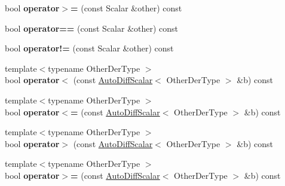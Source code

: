 \begin{DoxyCompactItemize}
\mbox{\label{class_eigen_1_1_auto_diff_scalar_a928b13db715c4631b0cab6feff259580}} 
bool {\bfseries operator$>$=} (const Scalar \&other) const
\item 
\mbox{\label{class_eigen_1_1_auto_diff_scalar_a576e2d0298d249bedd21b11e5373e6ed}} 
bool {\bfseries operator==} (const Scalar \&other) const
\item 
\mbox{\label{class_eigen_1_1_auto_diff_scalar_a2b38b00f5ea9930da21ffc01fc7133db}} 
bool {\bfseries operator!=} (const Scalar \&other) const
\item 
\mbox{\label{class_eigen_1_1_auto_diff_scalar_aecd428e16a509c76d5604dae6d68ff6d}} 
{\footnotesize template$<$typename Other\+Der\+Type $>$ }\\bool {\bfseries operator$<$} (const \hyperlink{class_eigen_1_1_auto_diff_scalar}{Auto\+Diff\+Scalar}$<$ Other\+Der\+Type $>$ \&b) const
\item 
\mbox{\label{class_eigen_1_1_auto_diff_scalar_ad3f29b9306f23230ff84ae30a5d35f8f}} 
{\footnotesize template$<$typename Other\+Der\+Type $>$ }\\bool {\bfseries operator$<$=} (const \hyperlink{class_eigen_1_1_auto_diff_scalar}{Auto\+Diff\+Scalar}$<$ Other\+Der\+Type $>$ \&b) const
\item 
\mbox{\label{class_eigen_1_1_auto_diff_scalar_a620709009b961f29437b2beeb6037d19}} 
{\footnotesize template$<$typename Other\+Der\+Type $>$ }\\bool {\bfseries operator$>$} (const \hyperlink{class_eigen_1_1_auto_diff_scalar}{Auto\+Diff\+Scalar}$<$ Other\+Der\+Type $>$ \&b) const
\item 
\mbox{\label{class_eigen_1_1_auto_diff_scalar_ae50812039ed161f3357587873ba2c26f}} 
{\footnotesize template$<$typename Other\+Der\+Type $>$ }\\bool {\bfseries operator$>$=} (const \hyperlink{class_eigen_1_1_auto_diff_scalar}{Auto\+Diff\+Scalar}$<$ Other\+Der\+Type $>$ \&b) const
\item 
\mbox{\label{class_eigen_1_1_auto_diff_scalar_a75a2c079719492832e48b01e6a1d5475}} 

\end{DoxyCompactItemize}
